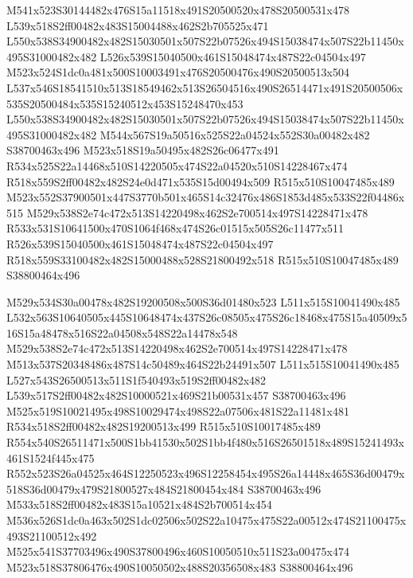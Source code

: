 \documentclass{article}
\begin{document}
\begin{multicols}{2}
M541x523S30144482x476S15a11518x491S20500520x478S20500531x478 L539x518S2ff00482x483S15004488x462S2b705525x471 L550x538S34900482x482S15030501x507S22b07526x494S15038474x507S22b11450x495S31000482x482 L526x539S15040500x461S15048474x487S22c04504x497 M523x524S1dc0a481x500S10003491x476S20500476x490S20500513x504 L537x546S18541510x513S18549462x513S26504516x490S26514471x491S20500506x535S20500484x535S15240512x453S15248470x453 L550x538S34900482x482S15030501x507S22b07526x494S15038474x507S22b11450x495S31000482x482 M544x567S19a50516x525S22a04524x552S30a00482x482 S38700463x496 M523x518S19a50495x482S26c06477x491 R534x525S22a14468x510S14220505x474S22a04520x510S14228467x474 R518x559S2ff00482x482S24e0d471x535S15d00494x509 R515x510S10047485x489 M523x552S37900501x447S3770b501x465S14c32476x486S1853d485x533S22f04486x515 M529x538S2e74c472x513S14220498x462S2e700514x497S14228471x478 R533x531S10641500x470S1064f468x474S26c01515x505S26c11477x511 R526x539S15040500x461S15048474x487S22c04504x497 R518x559S33100482x482S15000488x528S21800492x518 R515x510S10047485x489 S38800464x496

M529x534S30a00478x482S19200508x500S36d01480x523 L511x515S10041490x485 L532x563S10640505x445S10648474x437S26c08505x475S26c18468x475S15a40509x516S15a48478x516S22a04508x548S22a14478x548 M529x538S2e74c472x513S14220498x462S2e700514x497S14228471x478 M513x537S20348486x487S14c50489x464S22b24491x507 L511x515S10041490x485 L527x543S26500513x511S1f540493x519S2ff00482x482 L539x517S2ff00482x482S10000521x469S21b00531x457 S38700463x496 M525x519S10021495x498S10029474x498S22a07506x481S22a11481x481 R534x518S2ff00482x482S19200513x499 R515x510S10017485x489 R554x540S26511471x500S1bb41530x502S1bb4f480x516S26501518x489S15241493x461S1524f445x475 R552x523S26a04525x464S12250523x496S12258454x495S26a14448x465S36d00479x518S36d00479x479S21800527x484S21800454x484 S38700463x496 M533x518S2ff00482x483S15a10521x484S2b700514x454 M536x526S1dc0a463x502S1dc02506x502S22a10475x475S22a00512x474S21100475x493S21100512x492 M525x541S37703496x490S37800496x460S10050510x511S23a00475x474 M523x518S37806476x490S10050502x488S20356508x483 S38800464x496


\end{multicols}
\end{document}
